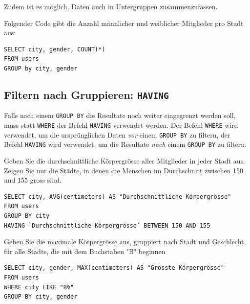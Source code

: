 Zudem ist es möglich, Daten auch in Untergruppen zusammenzufassen.

\begin{myexample}
Folgender Code gibt die Anzahl männlicher und weiblicher Mitglieder pro Stadt aus:
\begin{lstlisting}[style=sql]
SELECT city, gender, COUNT(*) 
FROM users 
GROUP by city, gender
\end{lstlisting}
\end{myexample}

\subsection{Filtern nach Gruppieren: \texorpdfstring{\lstinline[style=sql]|HAVING|}{HAVING}}
Falls nach einem \lstinline[style=sql]|GROUP BY| die Resultate noch weiter eingegrenzt werden soll, muss statt \lstinline[style=sql]|WHERE| der Befehl \lstinline[style=sql]|HAVING| verwendet werden. Der Befehl \lstinline[style=sql]|WHERE| wird verwendet, um die ursprünglichen Daten \textit{vor} einem \lstinline[style=sql]|GROUP BY| zu filtern, der Befehl \lstinline[style=sql]|HAVING| wird verwendet, um die Resultate \textit{nach} einem \lstinline[style=sql]|GROUP BY| zu filtern.

\begin{mychallenge}
  Geben Sie die durchschnittliche Körpergrösse aller Mitglieder in jeder Stadt aus. Zeigen Sie nur die Städte, in denen die Menschen im Durchschnitt zwischen 150 und 155 gross sind.
  \begin{myanswer}
    \begin{lstlisting}[style=sql]
SELECT city, AVG(centimeters) AS "Durchschnittliche Körpergrösse"
FROM users
GROUP BY city
HAVING `Durchschnittliche Körpergrösse` BETWEEN 150 AND 155
\end{lstlisting}
  \end{myanswer}
\end{mychallenge}

\begin{mychallenge}
  Geben Sie die maximale Körpergrösse aus, gruppiert nach Stadt und Geschlecht, für alle Städte, die mit dem Buchstaben "B" beginnen
  \begin{myanswer}
    \begin{lstlisting}[style=sql]
SELECT city, gender, MAX(centimeters) AS "Grösste Körpergrösse"
FROM users
WHERE city LIKE "B%"
GROUP BY city, gender
\end{lstlisting}
  \end{myanswer}
\end{mychallenge}

